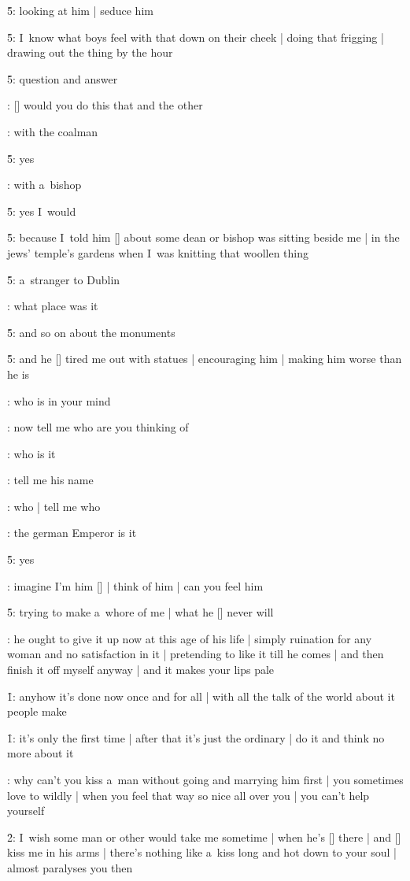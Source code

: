 \f5:
looking at him |
seduce him

\f5:
I~know what boys feel with that down on their cheek |
doing that frigging |
drawing out the thing by the hour

\f5:
question and answer

:
[\bloom] would you do this that and the other

:
with the coalman

\f5:
yes

:
with a~bishop

\f5:
yes I~would

\f5:
because I~told him [\bloom] about some dean or bishop was sitting beside me |
in the jews' temple's gardens when I~was knitting that woollen thing

\f5:
a~stranger to Dublin

:
what place was it

\f5:
and so on about the monuments

\f5:
and he [\bloom] tired me out with statues |
encouraging him |
making him worse than he is

:
who is in your mind

:
now tell me who are you thinking of

:
who is it

:
tell me his name

:
who |
tell me who

:
the german Emperor is it

\f5:
yes

:
imagine I'm him [\emperor] |
think of him |
can you feel him

\f5:
trying to make a~whore of me |
what he [\bloom] never will

:
he ought to give it up now at this age of his life |
simply ruination for any woman and no satisfaction in it |
pretending to like it till he comes |
and then finish it off myself anyway |
and it makes your lips pale

\f1:
anyhow it's done now once and for all |
with all the talk of the world about it people make

\f1:
it's only the first time |
after that it's just the ordinary |
do it and think no more about it

:
why can't you kiss a~man without going and marrying him first |
you sometimes love to wildly |
when you feel that way so nice all over you |
you can't help yourself

\f2:
I~wish some man or other would take me sometime |
when he's [\bloom] there |
and [\other] kiss me in his arms |
there's nothing like a~kiss long and hot down to your soul |
almost paralyses you then

